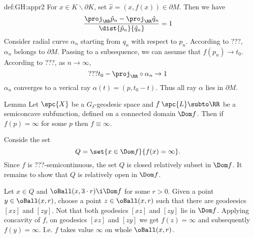 {\begin{subthm}{def:GH:appr2}
For $x\in K\backslash \partial K$, set $\hat x=(x, f(x))\in \partial M$.
Then we have 
$$\frac{\proj_\RR\hat p_n-\proj_\RR\hat q_n}{\dist{\hat p_n}{\hat q_n}}=1$$
Consider radial curve $\alpha_n$ starting from $q_n$ with respect to $p_n$.
According to ???, $\alpha_n$ belongs to $\partial M$.
Passing to a subsequence, we can assume that $f(p_n)\to t_0$.
According to ???, as $n\to\infty$, 
$$???t_0-\proj_\RR\circ\alpha_n\to 1$$
$\alpha_n$ converges to a verical ray $\alpha(t)=(p,t_0-t)$.
Thus all ray $\alpha$ lies in $\partial M$.\contradiction














\begin{thm}{Lemma}\label{lem:conc+infty}
Let $\spc{X}$ be a $G_\delta$-geodesic space and $f\:\spc{L}\subto\RR$ be a semiconcave subfunction, defined on a connected domain $\Dom f$.
Then if $f(p)=\infty$ for some $p$ then $f\equiv\infty$.
\end{thm}

 Conside the set 
$$Q=\set{x\in\Dom f}{f(x)=\infty}.$$
Since $f$ is ???-semicontinuous, the set $Q$ is closed relatively subset in $\Dom f$.
It remains to show that $Q$ is relatively open in $\Dom f$.

Let $x\in Q$ and $\oBall(x,3\cdot r)\i \Dom f$ for some $r>0$.
Given a point $y\in \oBall(x,r)$, 
choose a point $z\in\oBall(x,r)$ such that there are geodeesics $[xz]$ and $[zy]$.
Not that both geodesics $[xz]$ and $[zy]$ lie in $\Dom f$.
Applying concavity of $f$, on geodesics $[xz]$ and $[zy]$ we get $f(z)=\infty$ and subsequently $f(y)=\infty$.
I.e. $f$ takes value $\infty$ on whole $\oBall(x,r)$.\qeds




























\end{subthm}}
